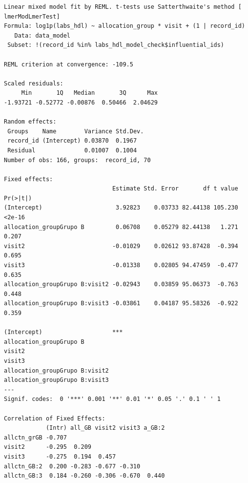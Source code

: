 \documentclass[
  letterpaper,
  DIV=11,
  numbers=noendperiod]{scrartcl}
\newenvironment{Shaded}{\begin{snugshade}}{\end{snugshade}}
\newcommand{\NormalTok}[1]{\textcolor[rgb]{0.00,0.23,0.31}{#1}}
\newcommand{\SpecialCharTok}[1]{\textcolor[rgb]{0.37,0.37,0.37}{#1}}
\begin{document}
\begin{verbatim}
Linear mixed model fit by REML. t-tests use Satterthwaite's method [
lmerModLmerTest]
Formula: log1p(labs_hdl) ~ allocation_group * visit + (1 | record_id)
   Data: data_model
 Subset: !(record_id %in% labs_hdl_model_check$influential_ids)

REML criterion at convergence: -109.5

Scaled residuals: 
     Min       1Q   Median       3Q      Max 
-1.93721 -0.52772 -0.00876  0.50466  2.04629 

Random effects:
 Groups    Name        Variance Std.Dev.
 record_id (Intercept) 0.03870  0.1967  
 Residual              0.01007  0.1004  
Number of obs: 166, groups:  record_id, 70

Fixed effects:
                               Estimate Std. Error       df t value Pr(>|t|)
(Intercept)                     3.92823    0.03733 82.44138 105.230   <2e-16
allocation_groupGrupo B         0.06708    0.05279 82.44138   1.271    0.207
visit2                         -0.01029    0.02612 93.87428  -0.394    0.695
visit3                         -0.01338    0.02805 94.47459  -0.477    0.635
allocation_groupGrupo B:visit2 -0.02943    0.03859 95.06373  -0.763    0.448
allocation_groupGrupo B:visit3 -0.03861    0.04187 95.58326  -0.922    0.359
                                  
(Intercept)                    ***
allocation_groupGrupo B           
visit2                            
visit3                            
allocation_groupGrupo B:visit2    
allocation_groupGrupo B:visit3    
---
Signif. codes:  0 '***' 0.001 '**' 0.01 '*' 0.05 '.' 0.1 ' ' 1

Correlation of Fixed Effects:
            (Intr) all_GB visit2 visit3 a_GB:2
allctn_grGB -0.707                            
visit2      -0.295  0.209                     
visit3      -0.275  0.194  0.457              
allctn_GB:2  0.200 -0.283 -0.677 -0.310       
allctn_GB:3  0.184 -0.260 -0.306 -0.670  0.440
\end{verbatim}

\begin{Shaded}
\end{Shaded}
\end{document}
